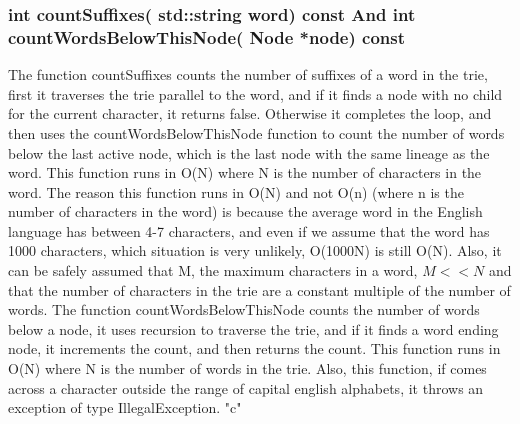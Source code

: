 \subsubsection{{\color{orange}int} {\color{draculapurple}countSuffixes}({\color{orange} std::string} word) {\color{GoldenYellow} const} And {\color{orange}int} {\color{draculapurple}countWordsBelowThisNode}({\color{orange} Node} *node) {\color{GoldenYellow} const}}
The function {\color{draculapurple}countSuffixes}  counts the number of suffixes of a word in the trie, first it traverses the trie parallel to the word, and if it 
finds a node with no child for the current character, it returns false. Otherwise it completes the loop, and then uses the 
{\color{draculapurple}countWordsBelowThisNode} function to count the number of words below the last active node, which is the 
last node with the same lineage as the word. This function runs in {\color{lightblue}O(N)} where {\color{lightblue}N} is the 
number of characters in the word. The reason this function runs in {\color{lightblue}O(N)} and not {\color{lightblue}O(n)} (where n is the number of characters in the word) is because the average word in the English language has between 4-7 characters, and even if we assume that the word has 1000 characters, which situation is very unlikely, {\color{lightblue}O(1000N)} is still {\color{lightblue}O(N)}. Also, it can be safely assumed that M, the maximum characters in a word, $M<<N$ and that the number of characters in the trie are a constant multiple of the number of words.
The function {\color{draculapurple}countWordsBelowThisNode} counts the number of words below a node, it uses recursion to traverse the trie, and if it finds a word ending node, it increments the count, and then returns the count. This function runs in {\color{lightblue}O(N)} where {\color{lightblue}N} is the number of words in the trie.
Also, this function, if comes across a character outside the range of capital english alphabets, it throws an exception of type {\color{orange}IllegalException}.
{\color{GoldenYellow} "c"}

